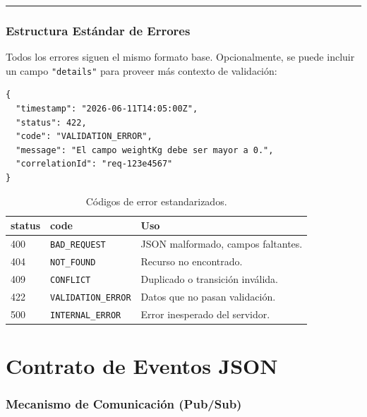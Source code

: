 \documentclass[11pt, a4paper]{article}
\begin{document}
\noindent\rule{\textwidth}{0.4pt}


\section{Estructura Estándar de Errores}
\label{sec:errores}

Todos los errores siguen el mismo formato base. Opcionalmente, se puede incluir un campo \texttt{"details"} para proveer más contexto de validación:

\begin{lstlisting}
{
  "timestamp": "2026-06-11T14:05:00Z",
  "status": 422,
  "code": "VALIDATION_ERROR",
  "message": "El campo weightKg debe ser mayor a 0.",
  "correlationId": "req-123e4567"
}
\end{lstlisting}

\begin{table}[h!]
\centering
\renewcommand{\arraystretch}{1.3}
\begin{tabularx}{\textwidth}{l l X}
  \toprule
  \textbf{status} & \textbf{code} & \textbf{Uso} \\
  \midrule
  400 & \texttt{BAD\_REQUEST}      & JSON malformado, campos faltantes. \\
  404 & \texttt{NOT\_FOUND}        & Recurso no encontrado. \\
  409 & \texttt{CONFLICT}          & Duplicado o transición inválida. \\
  422 & \texttt{VALIDATION\_ERROR} & Datos que no pasan validación. \\
  500 & \texttt{INTERNAL\_ERROR}   & Error inesperado del servidor. \\
  \bottomrule
\end{tabularx}
\caption{Códigos de error estandarizados.}
\end{table}


\newpage
\part{Contrato de Eventos JSON}

\section{Mecanismo de Comunicación (Pub/Sub)}
\end{document}
